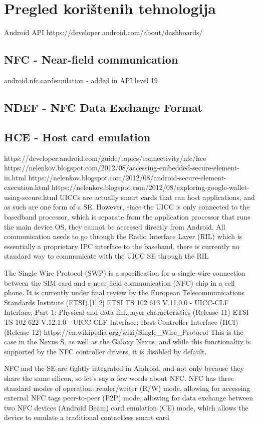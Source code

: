 \chapter{Pregled korištenih tehnologija}
Android API https://developer.android.com/about/dashboards/
\section{NFC - Near-field communication}
android.nfc.cardemulation - added in API level 19
\section{NDEF - NFC Data Exchange Format}
\section{HCE - Host card emulation}
https://developer.android.com/guide/topics/connectivity/nfc/hce
https://nelenkov.blogspot.com/2012/08/accessing-embedded-secure-element-in.html
https://nelenkov.blogspot.com/2012/08/android-secure-element-execution.html
https://nelenkov.blogspot.com/2012/08/exploring-google-wallet-using-secure.html
UICCs are actually smart cards that can host applications, and as such are one form of a SE. However, since the UICC is only connected to the basedband processor, which is separate from the application processor that runs the main device OS, they cannot be accessed directly from Android. All communication needs to go through the Radio Interface Layer (RIL) which is essentially a proprietary IPC interface to the baseband. 
there is currently no standard way to communicate with the UICC SE through the RIL

The Single Wire Protocol (SWP) is a specification for a single-wire connection between the SIM card and a near field communication (NFC) chip in a cell phone. It is currently under final review by the European Telecommunications Standards Institute (ETSI).[1][2]
 ETSI TS 102 613 V.11.0.0 - UICC-CLF Interface; Part 1: Physical and data link layer characteristics (Release 11)
  ETSI TS 102 622 V.12.1.0 - UICC-CLF Interface; Host Controller Interface (HCI) (Release 12)
  https://en.wikipedia.org/wiki/Single_Wire_Protocol
This is the case in the Nexus S, as well as the Galaxy Nexus, and while this functionality is supported by the NFC controller drivers, it is disabled by default.

NFC and the SE are tightly integrated in Android, and not only because they share the same silicon, so let's say a few words about NFC. NFC has three standard modes of operation: 
reader/writer (R/W) mode, allowing for accessing external NFC tags 
peer-to-peer (P2P) mode, allowing for data exchange between two NFC devices (Android Beam)
card emulation (CE) mode, which allows the device to emulate a traditional contactless smart card 

